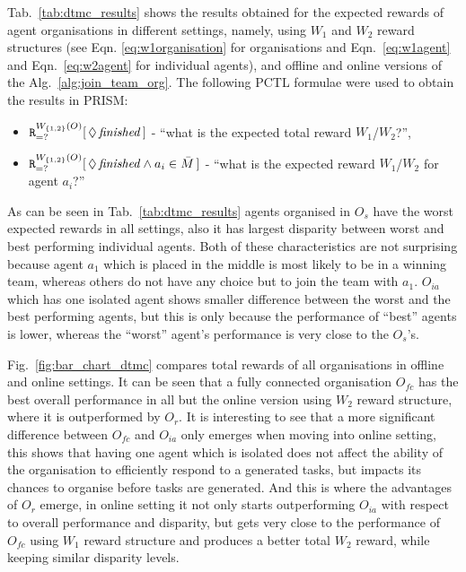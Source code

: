 \documentclass{llncs}
\begin{document}
Tab.~\ref{tab:dtmc_results} shows the results obtained for the expected rewards of agent organisations in different settings, namely, using $W_1$ and $W_2$ reward structures (see Eqn. \eqref{eq:w1organisation} %
for organisations and Eqn.~\eqref{eq:w1agent} and Eqn.~\eqref{eq:w2agent} for individual agents), and offline and online versions of the Alg.~\ref{alg:join_team_org}. The following PCTL formulae were used to obtain the results in PRISM:
\begin{itemize}
 \item ${\tt R}_{=?}^{W_{\{1,2\}}(O)}[\,\Diamond\,\mathit{finished}\,]$ -
``what is the expected total reward $W_1$/$W_2$?'',
 \item ${\tt R}_{=?}^{W_{\{1,2\}}(O)}[\,\Diamond\,\mathit{finished} \wedge a_i \in \bar{M} \,]$ -
``what is the expected reward $W_1$/$W_2$ for agent $a_i$?''
\end{itemize}

As can be seen in Tab.~\ref{tab:dtmc_results} agents organised in $O_s$ have the worst expected rewards in all settings, also it has largest disparity between worst and best performing individual agents. Both of these characteristics are not surprising because agent $a_1$ which is placed in the middle is most likely to be in a winning team, whereas others do not have any choice but to join the team with $a_1$. $O_{ia}$ which has one isolated agent shows smaller difference between the worst and the best performing agents, but this is only because the performance of ``best'' agents is lower, whereas the ``worst'' agent's performance is very close to the $O_s$'s.

Fig.~\ref{fig:bar_chart_dtmc} compares total rewards of all organisations in offline and online settings. It can be seen that a fully connected organisation $O_{fc}$ has the best overall performance in all but the online version using $W_2$ reward structure, where it is outperformed by $O_r$. It is interesting to see that a more significant difference between $O_{fc}$ and $O_{ia}$ only emerges when moving into online setting, this shows that having one agent which is isolated does not affect the ability of the organisation to efficiently respond to a generated tasks, but impacts its chances to organise before tasks are generated. And this is where the advantages of $O_r$ emerge, in online setting it not only starts outperforming $O_{ia}$ with respect to overall performance and disparity, but gets very close to the performance of $O_{fc}$ using $W_1$ reward structure and produces a better total $W_2$ reward, while keeping similar disparity levels.
\end{document}
